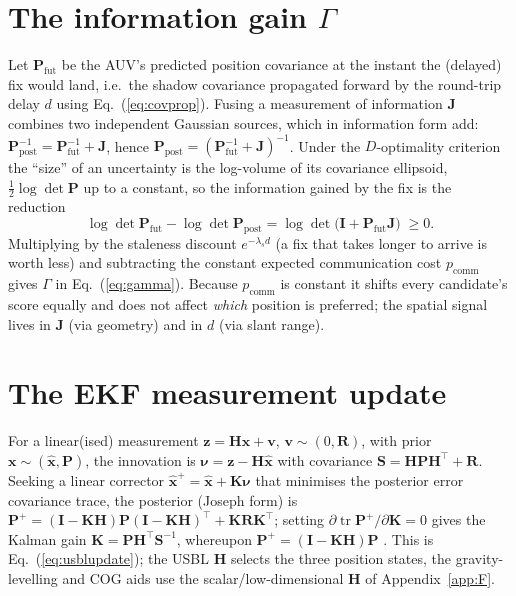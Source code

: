\documentclass[12pt,a4paper,oneside]{book}
\newcommand{\eqnref}[1]{Eq.~(\ref{#1})}
\begin{document}
\section{The information gain $\Gamma$}
\label{app:gamma}
Let $\mathbf{P}_{\text{fut}}$ be the AUV's predicted position covariance at the instant the (delayed) fix
would land, i.e.\ the shadow covariance propagated forward by the round-trip delay $d$ using
\eqnref{eq:covprop}. Fusing a measurement of information $\mathbf{J}$ combines two independent Gaussian
sources, which in information form add:
$\mathbf{P}_{\text{post}}^{-1}=\mathbf{P}_{\text{fut}}^{-1}+\mathbf{J}$, hence
$\mathbf{P}_{\text{post}}=(\mathbf{P}_{\text{fut}}^{-1}+\mathbf{J})^{-1}$. Under the $D$-optimality
criterion the ``size'' of an uncertainty is the log-volume of its covariance ellipsoid,
$\tfrac12\log\det\mathbf{P}$ up to a constant, so the information gained by the fix is the reduction
\begin{equation}
\log\det\mathbf{P}_{\text{fut}}-\log\det\mathbf{P}_{\text{post}}
=\log\det\!\big(\mathbf{I}+\mathbf{P}_{\text{fut}}\mathbf{J}\big)\;\ge 0 .
\end{equation}
Multiplying by the staleness discount $e^{-\lambda_s d}$ (a fix that takes longer to arrive is worth less)
and subtracting the constant expected communication cost $p_{\text{comm}}$ gives $\Gamma$ in
\eqnref{eq:gamma}. Because $p_{\text{comm}}$ is constant it shifts every candidate's score equally and does
not affect \emph{which} position is preferred; the spatial signal lives in $\mathbf{J}$ (via geometry) and
in $d$ (via slant range).

\section{The EKF measurement update}
\label{app:upd}
For a linear(ised) measurement $\mathbf{z}=\mathbf{H}\mathbf{x}+\mathbf{v}$, $\mathbf{v}\sim(0,\mathbf{R})$,
with prior $\mathbf{x}\sim(\hat{\mathbf{x}},\mathbf{P})$, the innovation is
$\boldsymbol{\nu}=\mathbf{z}-\mathbf{H}\hat{\mathbf{x}}$ with covariance
$\mathbf{S}=\mathbf{H}\mathbf{P}\mathbf{H}^{\!\top}+\mathbf{R}$. Seeking a linear corrector
$\hat{\mathbf{x}}^{+}=\hat{\mathbf{x}}+\mathbf{K}\boldsymbol{\nu}$ that minimises the posterior error
covariance trace, the posterior (Joseph form) is
$\mathbf{P}^{+}=(\mathbf{I}-\mathbf{K}\mathbf{H})\mathbf{P}(\mathbf{I}-\mathbf{K}\mathbf{H})^{\!\top}
+\mathbf{K}\mathbf{R}\mathbf{K}^{\!\top}$; setting
$\partial\operatorname{tr}\mathbf{P}^{+}/\partial\mathbf{K}=0$ gives the Kalman gain
$\mathbf{K}=\mathbf{P}\mathbf{H}^{\!\top}\mathbf{S}^{-1}$, whereupon
$\mathbf{P}^{+}=(\mathbf{I}-\mathbf{K}\mathbf{H})\mathbf{P}$ \cite{barshalom2001estimation}. This is
\eqnref{eq:usblupdate}; the USBL $\mathbf{H}$ selects the three position states, the gravity-levelling and
COG aids use the scalar/low-dimensional $\mathbf{H}$ of Appendix~\ref{app:F}.
\end{document}
